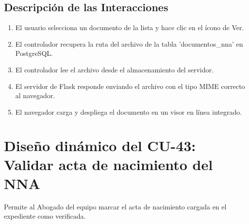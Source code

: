 \subsection{Descripción de las Interacciones}
\begin{enumerate}
    \item El usuario selecciona un documento de la lista y hace clic en el ícono de Ver.
    \item El controlador recupera la ruta del archivo de la tabla 'documentos\_nna' en PostgreSQL.
    \item El controlador lee el archivo desde el almacenamiento del servidor.
    \item El servidor de Flask responde enviando el archivo con el tipo MIME correcto al navegador.
    \item El navegador carga y despliega el documento en un visor en línea integrado.
\end{enumerate}

\cleardoublepage
\section{Diseño dinámico del CU-43: Validar acta de nacimiento del NNA}
\label{sec:disenoDinamicoCU43}

Permite al Abogado del equipo marcar el acta de nacimiento cargada en el expediente como verificada.

